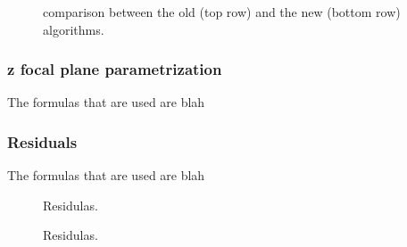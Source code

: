\begin{figure}[t]
  \centering
  \begin{subfigure}{0.5\textwidth}
    \scalebox{.6}{}
    \caption{}
    \label{mvTTm_chi2}
  \end{subfigure}%
  \hfill%
  \begin{subfigure}{0.5\textwidth}
    \scalebox{.6}{}
    \caption{}
    \label{mvm_chi2}
  \end{subfigure}
  \caption{\chisq comparison between the old \mvm (top row) and the new \mvTTm (bottom row) algorithms.}
 \label{mvm_chi2_comp}
\end{figure}

\subsubsection{z focal plane parametrization}
The formulas that are used are blah

\subsubsection{Residuals}
The formulas that are used are blah

\begin{figure}[t]
  \centering
  \begin{subfigure}{0.5\textwidth}
    \scalebox{.6}{}
    \caption{}
    \label{mvTTm_res_x}
  \end{subfigure}%
  \hfill%
  \begin{subfigure}{0.5\textwidth}
    \scalebox{.6}{}
    \caption{}
    \label{mvm_res_y}
  \end{subfigure}
  \caption{Residulas.  }
 \label{mvm_res}
\end{figure}

\begin{figure}[t]
  \centering
  \begin{subfigure}{0.5\textwidth}
    \scalebox{.6}{}
    \caption{}
    \label{mvTTm_res_x}
  \end{subfigure}%
  \hfill%
  \begin{subfigure}{0.5\textwidth}
    \scalebox{.6}{}
    \caption{}
    \label{mvm_res_y}
  \end{subfigure}
  \caption{Residulas.  }
 \label{mvm_res}
\end{figure}

